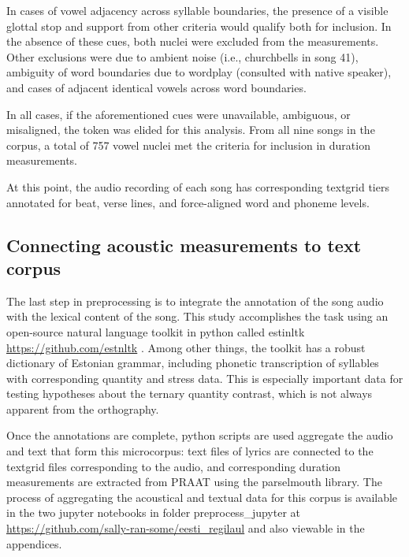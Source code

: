In cases of vowel adjacency across syllable boundaries, the presence of a visible glottal stop and support from other criteria would qualify both for inclusion. In the absence of these cues, both nuclei were excluded from the measurements. Other exclusions were due to ambient noise (i.e., churchbells in song 41), ambiguity of word boundaries due to wordplay (consulted with native speaker), and cases of adjacent identical vowels across word boundaries. 


In all cases, if the aforementioned cues were unavailable, ambiguous, or misaligned, the token was elided for this analysis. From all nine songs in the corpus, a total of 757 vowel nuclei met the criteria for inclusion in duration measurements. 



At this point, the audio recording of each song has corresponding textgrid tiers annotated for beat, verse lines, and force-aligned word and phoneme levels.
\subsection{Connecting acoustic measurements to text corpus}

The last step in preprocessing is to integrate the annotation of the song audio with the lexical content of the song. This study accomplishes the task using an open-source natural language toolkit in python called estinltk \url{https://github.com/estnltk} \citep{estnltk2020}. Among other things, the toolkit has a robust dictionary of Estonian grammar, including phonetic transcription of syllables with corresponding quantity and stress data. This is especially important data for testing hypotheses about the ternary quantity contrast, which is not always apparent from the orthography. 



Once the annotations are complete, python scripts are used aggregate the audio and text that form this microcorpus: text files of lyrics are connected to the textgrid files corresponding to the audio, and corresponding duration measurements are extracted from PRAAT using the parselmouth library\citep{parselmouth2018, python1995}. The process of aggregating the acoustical and textual data for this corpus is available in the two jupyter notebooks in folder preprocess_jupyter at \url{https://github.com/sally-ran-some/eesti_regilaul} and also viewable in the appendices. 




